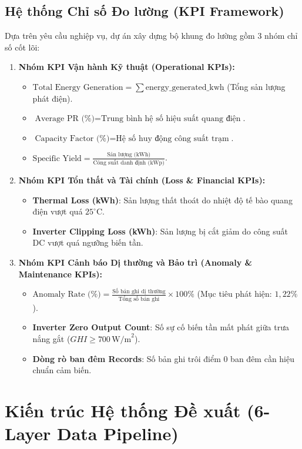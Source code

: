 \documentclass[12pt, a4paper]{report}
\begin{document}
\subsection{Hệ thống Chỉ số Đo lường (KPI Framework)}
Dựa trên yêu cầu nghiệp vụ, dự án xây dựng bộ khung đo lường gồm 3 nhóm chỉ số cốt lõi:
\begin{enumerate}[label=\arabic*., leftmargin=*]
    \item \textbf{Nhóm KPI Vận hành Kỹ thuật (Operational KPIs):}
    \begin{itemize}[noitemsep]
        \item $\text{Total Energy Generation} = \sum \text{energy\_generated\_kwh}$ (Tổng sản lượng phát điện).
        \item $\text{Average PR (\%)} = \text{Trung bình hệ số hiệu suất quang điện}$.
        \item $\text{Capacity Factor (\%)} = \text{Hệ số huy động công suất trạm}$.
        \item $\text{Specific Yield} = \frac{\text{Sản lượng (kWh)}}{\text{Công suất danh định (kWp)}}$.
    \end{itemize}
    \item \textbf{Nhóm KPI Tổn thất và Tài chính (Loss \& Financial KPIs):}
    \begin{itemize}[noitemsep]
        \item \textbf{Thermal Loss (kWh)}: Sản lượng thất thoát do nhiệt độ tế bào quang điện vượt quá $25^\circ\text{C}$.
        \item \textbf{Inverter Clipping Loss (kWh)}: Sản lượng bị cắt giảm do công suất DC vượt quá ngưỡng biến tần.
    \end{itemize}
    \item \textbf{Nhóm KPI Cảnh báo Dị thường và Bảo trì (Anomaly \& Maintenance KPIs):}
    \begin{itemize}[noitemsep]
        \item $\text{Anomaly Rate (\%)} = \frac{\text{Số bản ghi dị thường}}{\text{Tổng số bản ghi}} \times 100\%$ (Mục tiêu phát hiện: $1{,}22\%$).
        \item \textbf{Inverter Zero Output Count}: Số sự cố biến tần mất phát giữa trưa nắng gắt ($GHI \ge 700\,\text{W/m}^2$).
        \item \textbf{Dòng rò ban đêm Records}: Số bản ghi trôi điểm 0 ban đêm cần hiệu chuẩn cảm biến.
    \end{itemize}
\end{enumerate}

\section{Kiến trúc Hệ thống Đề xuất (6-Layer Data Pipeline)}
\label{sec:kientruc_dexuat}
\end{document}

